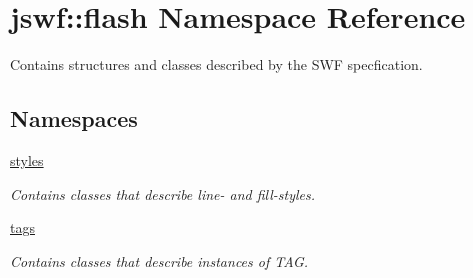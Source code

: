 \hypertarget{namespacejswf_1_1flash}{\section{jswf\+:\+:flash Namespace Reference}
\label{namespacejswf_1_1flash}
}


Contains structures and classes described by the S\+W\+F specfication.  


\subsection*{Namespaces}
\begin{DoxyCompactItemize}
\item 
 \hyperlink{namespacejswf_1_1flash_1_1styles}{styles}
\begin{DoxyCompactList}\small\item\em Contains classes that describe line-\/ and fill-\/styles. \end{DoxyCompactList}\item 
 \hyperlink{namespacejswf_1_1flash_1_1tags}{tags}
\begin{DoxyCompactList}\small\item\em Contains classes that describe instances of {\ttfamily T\+A\+G}. \end{DoxyCompactList}\end{DoxyCompactItemize}
